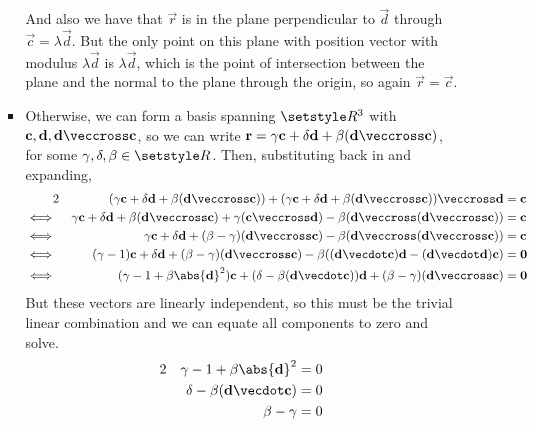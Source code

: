 \documentclass[fleqn,a4paper,11pt]{article}
\begin{document}
\begin{enumerate}
\begin{enumerate}[(i)]
\begin{itemize}
        And also we have that \(\vec r\) is in the plane perpendicular to
        \(\vec d\) through \(\vec c = \lambda \vec d\). But the only point on
        this plane with position vector with modulus \(\lambda \vec d\) is
        \(\lambda \vec d\), which is the point of intersection between the plane
        and the normal to the plane through the origin, so again
        \(\vec r = \vec c\).
       \item
        Otherwise, we can form a basis spanning \(\Reals^3\) with
        \({\vec c, \vec d, \vec d \veccross \vec c}\), so we can write
        \(\vec r = \gamma \vec c + \delta \vec d
                   + \beta(\vec d \veccross \vec c)\), for some
        \(\gamma, \delta, \beta \in \Reals\).
        Then, substituting back in and expanding,
        \begin{alignat*}2
         && (\gamma \vec c + \delta \vec d
             + \beta(\vec d \veccross \vec c)) +
            (\gamma \vec c + \delta \vec d
             + \beta(\vec d \veccross \vec c)) \veccross \vec d
             &= \vec c \\
         \iff{}&&
         \gamma \vec c + \delta \vec d + \beta (\vec d \veccross \vec c)
          + \gamma (\vec c \veccross \vec d)
          - \beta(\vec d \veccross(\vec d \veccross \vec c)) &= \vec c \\
         \iff{}&&
         \gamma \vec c + \delta \vec d
          + (\beta - \gamma)(\vec d \veccross \vec c)
          - \beta(\vec d \veccross(\vec d \veccross \vec c)) &= \vec c \\
         \iff{}&&
         (\gamma - 1) \vec c + \delta \vec d
          + (\beta - \gamma)(\vec d \veccross \vec c)
          - \beta((\vec d \vecdot \vec c)\vec d
                  - (\vec d \vecdot \vec d) \vec c) &= \vec 0 \\
         \iff{}&&
         (\gamma - 1 + \beta\abs{\vec d}^2)\vec c +
         (\delta - \beta(\vec d \vecdot \vec c))\vec d +
         (\beta - \gamma)(\vec d \veccross \vec c) &= \vec 0
        \end{alignat*}
        But these vectors are linearly independent, so this must be the trivial
        linear combination and we can equate all components to zero and solve.
        \begin{alignat*}2
         && \gamma - 1 + \beta \abs{\vec d}^2 &= 0 \\
         && \delta - \beta(\vec d \vecdot \vec c) &= 0 \\
         && \beta - \gamma &= 0 \\

\end{alignat*}
\end{itemize}
\end{enumerate}
\end{enumerate}
\end{document}
